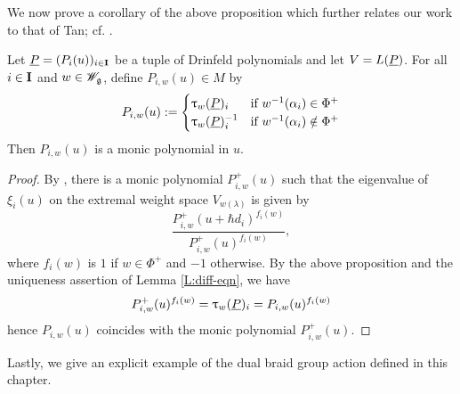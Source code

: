 We now prove a corollary of the above proposition which further relates our work to that of Tan; cf. \cite[Prop. 4.5]{tan_braid_2015}.

\begin{corollary}\label{C:Tan-monic}
    Let $\underline{P} = (P_i(u))_{i\in\mathbf{I}}$ be a tuple of Drinfeld polynomials and let $V = L(\underline{P})$.
    For all $i\in\mathbf{I}$ and $w\in\mathscr{W}_{\mathfrak{g}}$, define $P_{i,w}(u)\in M$ by
    \[P_{i,w}(u) :=
    \begin{cases}
        \uptau_w(\underline{P})_i & \text{if } w^{-1}(\alpha_i)\in\Phi^+ \\
        \uptau_w(\underline{P})_i^{-1} & \text{if } w^{-1}(\alpha_i)\notin\Phi^+
    \end{cases}\]
    Then $P_{i,w}(u)$ is a monic polynomial in $u$.
\end{corollary}
\begin{proof}
    By \cite[Remark 2.2]{chari_fundamental_1991}, there is a monic polynomial $P^+_{i,w}(u)$ such that the eigenvalue of $\xi_i(u)$ on the extremal weight space $V_{w(\lambda)}$ is given by
    \[\frac{P^+_{i,w}(u+\hbar d_i)^{f_i(w)}}{P^+_{i,w}(u)^{f_i(w)}},\]
    where $f_i(w)$ is $1$ if $w\in\Phi^+$ and $-1$ otherwise.
    By the above proposition and the uniqueness assertion of Lemma \ref{L:diff-eqn}, we have
    \[P^+_{i,w}(u)^{f_i(w)} = \uptau_w(\underline{P})_i = P_{i,w}(u)^{f_i(w)}\]
    hence $P_{i,w}(u)$ coincides with the monic polynomial $P^+_{i,w}(u)$.
\end{proof}

Lastly, we give an explicit example of the dual braid group action defined in this chapter.


